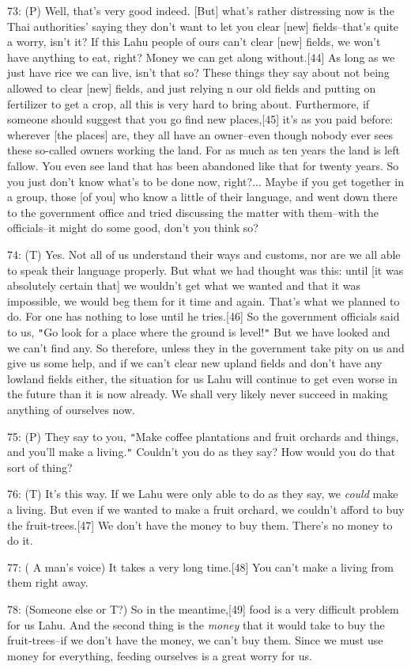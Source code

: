 73: (P) Well, that's very good indeed. [But] what's rather distressing now is the
Thai authorities' saying they don't want to let you clear [new] fields--that's
quite a worry, isn't it? If this Lahu people of ours can't clear [new] fields,
we won't have anything to eat, right? Money we can get along without.[44] As long
as we just have rice we can live, isn't that so? These things they say about not
being allowed to clear [new] fields, and just relying n our old fields and putting
on fertilizer to get a crop, all this is very hard to bring about. Furthermore,
if someone should suggest that you go find new places,[45] it's as you paid before:
wherever [the places] are, they all have an owner--even though nobody ever sees
these so-called owners working the land. For as much as ten years the land is left
fallow. You even see land that has been abandoned like that for twenty years. So
you just don't know what's to be done now, right?... Maybe if you get together
in a group, those [of you] who know a little of their language, and went down there
to the government office and tried discussing the matter with them--with the officials--it
might do some good, don't you think so?

74: (T) Yes. Not all of us understand their ways and customs, nor are we all able
to speak their language properly. But what we had thought was this: until [it was
absolutely certain that] we wouldn't get what we wanted and that it was impossible,
we would beg them for it time and again. That's what we planned to do. For one
has nothing to lose until he tries.[46] So the government officials said to us,
\texttt{"}Go look for a place where the ground is level!\texttt{"} But we have
looked and we can't find any. So therefore, unless they in the government take
pity on us and give us some help, and if we can't clear new upland fields and don't
have any lowland fields either, the situation for us Lahu will continue to get
even worse in the future than it is now already. We shall very likely never succeed
in making anything of ourselves now.

75: (P) They say to you, \texttt{"}Make coffee plantations and fruit orchards and
things, and you'll make a living.\texttt{"} Couldn't you do as they say? How would
you do that sort of thing?

76: (T) It's this way. If we Lahu were only able to do as they say, we \textit{could}
make a living. But even if we wanted to make a fruit orchard, we couldn't afford
to buy the fruit-trees.[47] We don't have the money to buy them. There's no money
to do it.

77: ( A man's voice) It takes a very long time.[48] You can't make a living from
them right away.

78: (Someone else or T?) So in the meantime,[49] food is a very difficult problem
for us Lahu. And the second thing is the \textit{money} that it would take to buy
the fruit-trees--if we don't have the money, we can't buy them. Since we must use
money for everything, feeding ourselves is a great worry for us.

